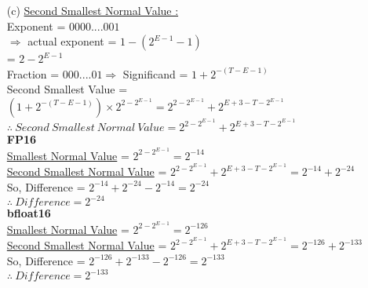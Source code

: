 \documentclass[letterpaper]{article}
\begin{document}
\begin{large}
\begin{flushleft}
\begin{enumerate}
\begin{enumerate}
\item[(c) ]
\underline{Second Smallest Normal Value :}\\[0.1in]
Exponent = $0000....001$\\[0.1in]
$\Rightarrow$ actual exponent = $1 - (2^{E-1}-1)$\\[0.1in]
\qquad\qquad\qquad\qquad\:\!\! = $2 - 2^{E-1}$\\[0.1in]
Fraction = $000....01$\quad$\Rightarrow$ Significand = $1+2^{-(T-E-1)}$\\[0.1in]
Second Smallest Value = $(1+2^{-(T-E-1)})\times 2^{2 - 2^{E-1}}=2^{2-2^{E-1}}+2^{E+3-T-2^{E-1}}$\\[0.1in]
$\boxed{\therefore\ Second\ Smallest\ Normal\ Value =2^{2-2^{E-1}}+2^{E+3-T-2^{E-1}}}$\\[0.2in]
\textbf{FP16}\\[0.1in]
\underline{Smallest Normal Value} = $2^{2 - 2^{E-1}}=2^{-14}$\\[0.1in]
\underline{Second Smallest Normal Value} = $2^{2-2^{E-1}}+2^{E+3-T-2^{E-1}}=2^{-14}+2^{-24}$\\[0.1in]
So, Difference = $2^{-14}+2^{-24}-2^{-14}=2^{-24} $\\[0.1in]
$\boxed{\therefore\ Difference = 2^{-24}}$\\[0.1in]
\clearpage
\textbf{bfloat16}\\[0.1in]
\underline{Smallest Normal Value} = $2^{2- 2^{E-1}}=2^{-126}$\\[0.1in]
\underline{Second Smallest Normal Value} = $2^{2-2^{E-1}}+2^{E+3-T-2^{E-1}}=2^{-126}+2^{-133}$\\[0.1in]
So, Difference = $2^{-126}+2^{-133}-2^{-126}=2^{-133} $\\[0.1in]
$\boxed{\therefore\ Difference = 2^{-133}}$\\[0.2in]


\end{enumerate}
\end{enumerate}
\end{flushleft}
\end{large}
\end{document}
